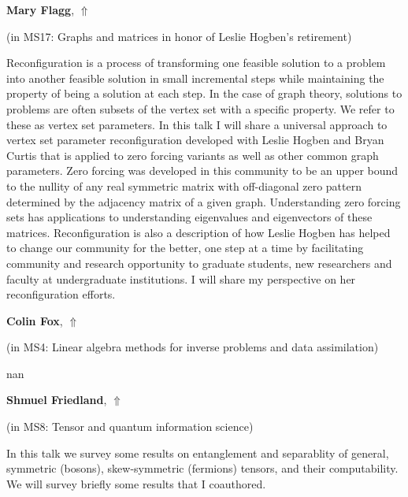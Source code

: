 \documentclass[ILAS2025-program.tex]{subfiles}
\begin{document}
     \hypertarget{down0375}{}\begin{ilasabstract}
    
    \textbf{Mary Flagg},  \hfill \hyperlink{up0375}{$\Uparrow$}
    
    (in {\color{mstitle}MS17: Graphs and matrices in honor of Leslie Hogben's retirement})
        
        \mtskip
    Reconfiguration is a process of transforming one feasible solution to a problem into another feasible solution in small incremental steps while maintaining the property of being a solution at each step. In the case of graph theory, solutions to problems are often subsets of the vertex set with a specific property. We refer to these as vertex set parameters. In this talk I will share a universal approach to vertex set parameter reconfiguration developed with Leslie Hogben and Bryan Curtis that is applied to zero forcing variants as well as other common graph parameters. Zero forcing was developed in this community to be an upper bound to the nullity of any real symmetric matrix with off-diagonal zero pattern determined by the adjacency matrix of a given graph. Understanding zero forcing sets has applications to understanding eigenvalues and eigenvectors of these matrices. 
Reconfiguration is also a description of how Leslie Hogben has helped to change our community for the better, one step at a time by facilitating community and research opportunity to graduate students, new researchers and faculty at undergraduate institutions. I will share my perspective on her reconfiguration efforts.
\end{ilasabstract}
     \hypertarget{down0314}{}\begin{ilasabstract}
    
    \textbf{Colin Fox},  \hfill \hyperlink{up0314}{$\Uparrow$}
    
    (in {\color{mstitle}MS4: Linear algebra methods for inverse problems and data assimilation})
        
        \mtskip
    nan\end{ilasabstract}
     \hypertarget{down0021}{}\begin{ilasabstract}
    
    \textbf{Shmuel Friedland},  \hfill \hyperlink{up0021}{$\Uparrow$}
    
    (in {\color{mstitle}MS8: Tensor and quantum information science})
        
        \mtskip
    In this talk we survey some results on entanglement and separablity of general, symmetric (bosons),  skew-symmetric (fermions) tensors, and their computability.  We will survey briefly some results that I coauthored.\end{ilasabstract}
\end{document}
